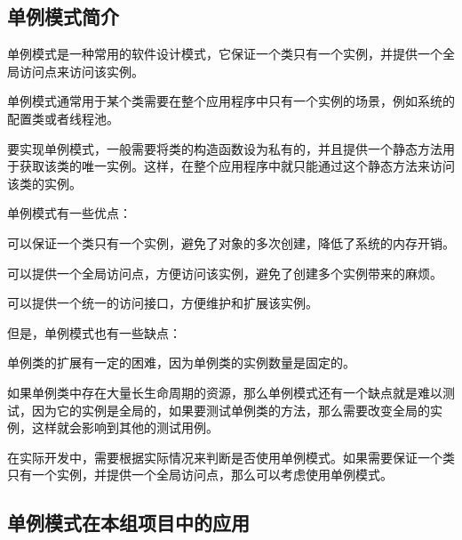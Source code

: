 \documentclass[cn,black,12pt,normal]{elegantnote}
\begin{document}
\subsection{单例模式简介}

单例模式是一种常用的软件设计模式，它保证一个类只有一个实例，并提供一个全局访问点来访问该实例。

单例模式通常用于某个类需要在整个应用程序中只有一个实例的场景，例如系统的配置类或者线程池。

要实现单例模式，一般需要将类的构造函数设为私有的，并且提供一个静态方法用于获取该类的唯一实例。这样，在整个应用程序中就只能通过这个静态方法来访问该类的实例。

单例模式有一些优点：

可以保证一个类只有一个实例，避免了对象的多次创建，降低了系统的内存开销。

可以提供一个全局访问点，方便访问该实例，避免了创建多个实例带来的麻烦。

可以提供一个统一的访问接口，方便维护和扩展该实例。

但是，单例模式也有一些缺点：

单例类的扩展有一定的困难，因为单例类的实例数量是固定的。

如果单例类中存在大量长生命周期的资源，那么单例模式还有一个缺点就是难以测试，因为它的实例是全局的，如果要测试单例类的方法，那么需要改变全局的实例，这样就会影响到其他的测试用例。

在实际开发中，需要根据实际情况来判断是否使用单例模式。如果需要保证一个类只有一个实例，并提供一个全局访问点，那么可以考虑使用单例模式。

\subsection{单例模式在本组项目中的应用}
\end{document}
